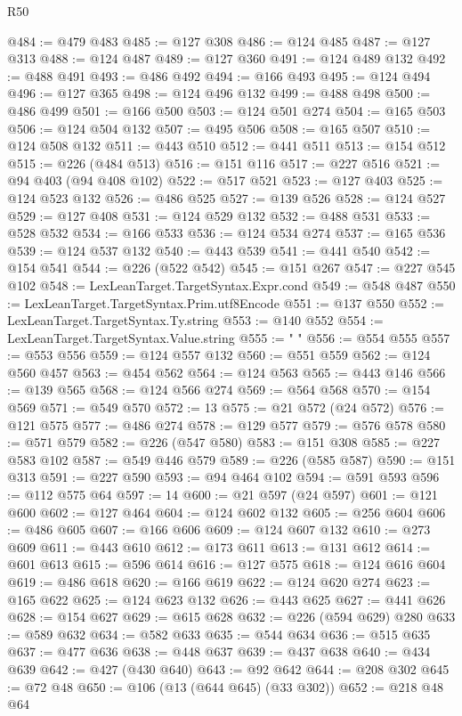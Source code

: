 \begin{lexlean}{R50}
\begin{coremodule}
@484 := @479 @483
@485 := @127 @308
@486 := @124 @485
@487 := @127 @313
@488 := @124 @487
@489 := @127 @360
@491 := @124 @489 @132
@492 := @488 @491
@493 := @486 @492
@494 := @166 @493
@495 := @124 @494
@496 := @127 @365
@498 := @124 @496 @132
@499 := @488 @498
@500 := @486 @499
@501 := @166 @500
@503 := @124 @501 @274
@504 := @165 @503
@506 := @124 @504 @132
@507 := @495 @506
@508 := @165 @507
@510 := @124 @508 @132
@511 := @443 @510
@512 := @441 @511
@513 := @154 @512
@515 := @226 (@484 @513)
@516 := @151 @116
@517 := @227 @516
@521 := @94 @403 (@94 @408 @102)
@522 := @517 @521
@523 := @127 @403
@525 := @124 @523 @132
@526 := @486 @525
@527 := @139 @526
@528 := @124 @527
@529 := @127 @408
@531 := @124 @529 @132
@532 := @488 @531
@533 := @528 @532
@534 := @166 @533
@536 := @124 @534 @274
@537 := @165 @536
@539 := @124 @537 @132
@540 := @443 @539
@541 := @441 @540
@542 := @154 @541
@544 := @226 (@522 @542)
@545 := @151 @267
@547 := @227 @545 @102
@548 := LexLeanTarget.TargetSyntax.Expr.cond
@549 := @548 @487
@550 := LexLeanTarget.TargetSyntax.Prim.utf8Encode
@551 := @137 @550
@552 := LexLeanTarget.TargetSyntax.Ty.string
@553 := @140 @552
@554 := LexLeanTarget.TargetSyntax.Value.string
@555 := " "
@556 := @554 @555
@557 := @553 @556
@559 := @124 @557 @132
@560 := @551 @559
@562 := @124 @560 @457
@563 := @454 @562
@564 := @124 @563
@565 := @443 @146
@566 := @139 @565
@568 := @124 @566 @274
@569 := @564 @568
@570 := @154 @569
@571 := @549 @570
@572 := 13
@575 := @21 @572 (@24 @572)
@576 := @121 @575
@577 := @486 @274
@578 := @129 @577
@579 := @576 @578
@580 := @571 @579
@582 := @226 (@547 @580)
@583 := @151 @308
@585 := @227 @583 @102
@587 := @549 @446 @579
@589 := @226 (@585 @587)
@590 := @151 @313
@591 := @227 @590
@593 := @94 @464 @102
@594 := @591 @593
@596 := @112 @575 @64
@597 := 14
@600 := @21 @597 (@24 @597)
@601 := @121 @600
@602 := @127 @464
@604 := @124 @602 @132
@605 := @256 @604
@606 := @486 @605
@607 := @166 @606
@609 := @124 @607 @132
@610 := @273 @609
@611 := @443 @610
@612 := @173 @611
@613 := @131 @612
@614 := @601 @613
@615 := @596 @614
@616 := @127 @575
@618 := @124 @616 @604
@619 := @486 @618
@620 := @166 @619
@622 := @124 @620 @274
@623 := @165 @622
@625 := @124 @623 @132
@626 := @443 @625
@627 := @441 @626
@628 := @154 @627
@629 := @615 @628
@632 := @226 (@594 @629) @280
@633 := @589 @632
@634 := @582 @633
@635 := @544 @634
@636 := @515 @635
@637 := @477 @636
@638 := @448 @637
@639 := @437 @638
@640 := @434 @639
@642 := @427 (@430 @640)
@643 := @92 @642
@644 := @208 @302
@645 := @72 @48
@650 := @106 (@13 (@644 @645) (@33 @302))
@652 := @218 @48 @64

\end{coremodule}
\end{lexlean}

